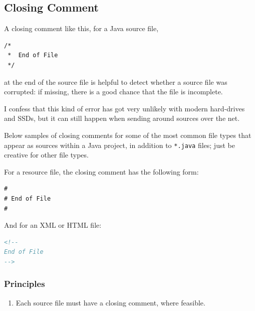\subsection{Closing Comment}\label{sec:ClosingComment}
A closing comment like this, for a Java source file,
\begin{lstlisting}[caption={Closing Comment for a Java file}]
/*
 *  End of File
 */
\end{lstlisting}
at the end of the source file is helpful to detect whether a source file was corrupted: if missing, there is a good chance that the file is incomplete.

I confess that this kind of error has got very unlikely with modern hard-drives and SSDs, but it can still happen when sending around sources over the net.

Below samples of closing comments for some of the most common file types that appear as sources within a Java project, in addition to \verb#*.java# files; just be creative for other file types.

For a resource file, the closing comment has the following form: 
\begin{lstlisting}[language={},caption={Closing Comment for a resource or a script file}]
#
# End of File
#
\end{lstlisting}

And for an XML or HTML file:
\begin{lstlisting}[language=XML,caption={Closing Comment for a HTML or an XML file}]
<!--
End of File
-->
\end{lstlisting}

\subsubsection{Principles}
\begin{enumerate}[label=P\arabic*.]
\item{Each source file must have a closing comment, where feasible.}
\end{enumerate}

